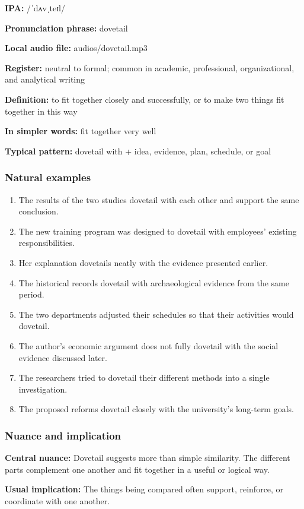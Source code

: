 \documentclass[11pt]{article}
\begin{document}
\textbf{IPA:} /ˈdʌvˌteɪl/

\textbf{Pronunciation phrase:} dovetail

\textbf{Local audio file:} audios/dovetail.mp3

\textbf{Register:} neutral to formal; common in academic, professional, organizational, and analytical writing

\textbf{Definition:} to fit together closely and successfully, or to make two things fit together in this way

\textbf{In simpler words:} fit together very well

\textbf{Typical pattern:} dovetail with + idea, evidence, plan, schedule, or goal

\subsubsection{Natural examples}
\begin{enumerate}
  \item The results of the two studies dovetail with each other and support the same conclusion.
  \item The new training program was designed to dovetail with employees' existing responsibilities.
  \item Her explanation dovetails neatly with the evidence presented earlier.
  \item The historical records dovetail with archaeological evidence from the same period.
  \item The two departments adjusted their schedules so that their activities would dovetail.
  \item The author's economic argument does not fully dovetail with the social evidence discussed later.
  \item The researchers tried to dovetail their different methods into a single investigation.
  \item The proposed reforms dovetail closely with the university's long-term goals.
\end{enumerate}

\subsubsection{Nuance and implication}
\textbf{Central nuance:} Dovetail suggests more than simple similarity. The different parts complement one another and fit together in a useful or logical way.

\textbf{Usual implication:} The things being compared often support, reinforce, or coordinate with one another.
\end{document}
